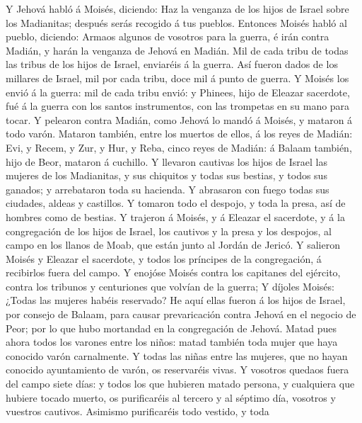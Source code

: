  Y Jehová habló á Moisés, diciendo:  Haz la
venganza de los hijos de Israel sobre los Madianitas; después serás
recogido á tus pueblos.  Entonces Moisés habló al pueblo,
diciendo: Armaos algunos de vosotros para la guerra, é irán contra
Madián, y harán la venganza de Jehová en Madián.  Mil de
cada tribu de todas las tribus de los hijos de Israel, enviaréis á la
guerra.  Así fueron dados de los millares de Israel, mil
por cada tribu, doce mil á punto de guerra.  Y Moisés los
envió á la guerra: mil de cada tribu envió: y Phinees, hijo de Eleazar
sacerdote, fué á la guerra con los santos instrumentos, con las
trompetas en su mano para tocar.  Y pelearon contra
Madián, como Jehová lo mandó á Moisés, y mataron á todo varón.
 Mataron también, entre los muertos de ellos, á los reyes
de Madián: Evi, y Recem, y Zur, y Hur, y Reba, cinco reyes de Madián: á
Balaam también, hijo de Beor, mataron á cuchillo.  Y
llevaron cautivas los hijos de Israel las mujeres de los Madianitas, y
sus chiquitos y todas sus bestias, y todos sus ganados; y arrebataron
toda su hacienda.  Y abrasaron con fuego todas sus
ciudades, aldeas y castillos.  Y tomaron todo el despojo,
y toda la presa, así de hombres como de bestias.  Y
trajeron á Moisés, y á Eleazar el sacerdote, y á la congregación de los
hijos de Israel, los cautivos y la presa y los despojos, al campo en los
llanos de Moab, que están junto al Jordán de Jericó.  Y
salieron Moisés y Eleazar el sacerdote, y todos los príncipes de la
congregación, á recibirlos fuera del campo.  Y enojóse
Moisés contra los capitanes del ejército, contra los tribunos y
centuriones que volvían de la guerra;  Y díjoles Moisés:
¿Todas las mujeres habéis reservado?  He aquí ellas
fueron á los hijos de Israel, por consejo de Balaam, para causar
prevaricación contra Jehová en el negocio de Peor; por lo que hubo
mortandad en la congregación de Jehová.  Matad pues ahora
todos los varones entre los niños: matad también toda mujer que haya
conocido varón carnalmente.  Y todas las niñas entre las
mujeres, que no hayan conocido ayuntamiento de varón, os reservaréis
vivas.  Y vosotros quedaos fuera del campo siete días: y
todos los que hubieren matado persona, y cualquiera que hubiere tocado
muerto, os purificaréis al tercero y al séptimo día, vosotros y vuestros
cautivos.  Asimismo purificaréis todo vestido, y toda
